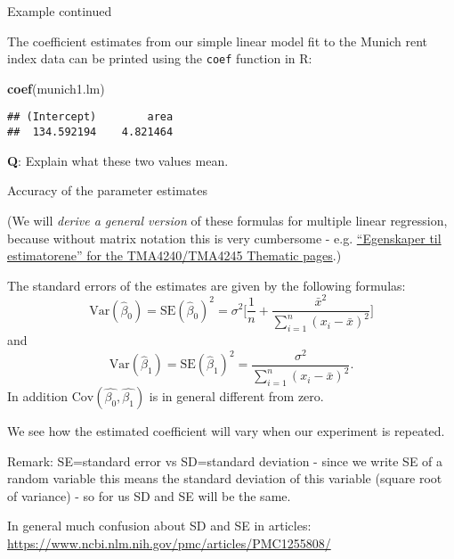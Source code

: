 \documentclass[ignorenonframetext,]{beamer}
\newenvironment{Shaded}{\begin{snugshade}}{\end{snugshade}}
\newcommand{\KeywordTok}[1]{\textcolor[rgb]{0.13,0.29,0.53}{\textbf{#1}}}
\newcommand{\NormalTok}[1]{#1}
\begin{document}
\begin{frame}[fragile]

\begin{block}{Example continued}

The coefficient estimates from our simple linear model fit to the Munich
rent index data can be printed using the \texttt{coef} function in R:

\begin{Shaded}
\begin{Highlighting}[]
\KeywordTok{coef}\NormalTok{(munich1.lm)}
\end{Highlighting}
\end{Shaded}

\begin{verbatim}
## (Intercept)        area 
##  134.592194    4.821464
\end{verbatim}

\textbf{Q}: Explain what these two values mean.

\end{block}

\end{frame}

\begin{frame}

\begin{block}{Accuracy of the parameter estimates}

(We will \emph{derive a general version} of these formulas for multiple
linear regression, because without matrix notation this is very
cumbersome - e.g.
\href{https://wiki.math.ntnu.no/tma4245/tema/begreper/regression}{``Egenskaper
til estimatorene'' for the TMA4240/TMA4245 Thematic pages}.)

The standard errors of the estimates are given by the following
formulas:
\[\text{Var}(\hat{\beta}_0)=\text{SE}(\hat{\beta}_0)^2 = \sigma^2 \Big [ \frac{1}{n} + \frac{\bar{x}^2}{\sum_{i=1}^n (x_i -\bar{x})^2} \Big]\]
and
\[\text{Var}(\hat{\beta}_1)=\text{SE}(\hat{\beta}_1)^2 = \frac{\sigma^2}{\sum_{i=1}^n (x_i-\bar{x})^2}.\]
In addition \(\text{Cov}(\hat{\beta_0},\hat{\beta_1})\) is in general
different from zero.

\end{block}

\end{frame}

\begin{frame}

We see how the estimated coefficient will vary when our experiment is
repeated.

Remark: SE=standard error vs SD=standard deviation - since we write SE
of a random variable this means the standard deviation of this variable
(square root of variance) - so for us SD and SE will be the same.

In general much confusion about SD and SE in articles:
\url{https://www.ncbi.nlm.nih.gov/pmc/articles/PMC1255808/}

\end{frame}
\end{document}
